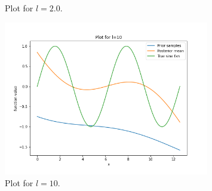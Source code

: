 \documentclass[a4paper,11pt]{article}
\begin{document}
\begin{pmisolution}
\begin{figure}[h]
\caption{Plot for \(l=2.0\).}
\label{fig:q4_2}
\end{figure}
\begin{figure}[h]
\centering
\includegraphics[height=2.65in]{question_4_10.png}
\caption{Plot for \(l=10\).} 
\label{fig:q4_10}
\end{figure}

\end{pmisolution}
\end{document}

